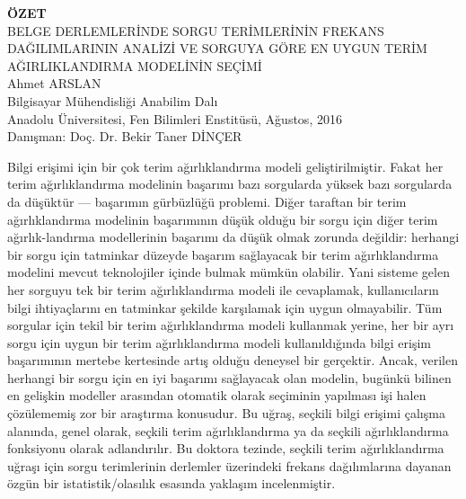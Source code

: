 \newpage
\begin{spacing}{1.1}
\begin{center}
\textbf{\"{O}ZET} \vspace{4mm}\\
BELGE DERLEMLER\.{I}NDE SORGU TER\.{I}MLER\.{I}N\.{I}N FREKANS DA\u{G}ILIMLARININ ANAL\.{I}Z\.{I} VE SORGUYA G\"{O}RE EN UYGUN TER\.{I}M A\u{G}IRLIKLANDIRMA MODEL\.{I}N\.{I}N SE\c{C}\.{I}M\.{I}\\
\vspace{4mm}
Ahmet ARSLAN
\vspace{4mm} \\
Bilgisayar M\"{u}hendisli\u{g}i Anabilim Dal{\i} \\
Anadolu \"{U}niversitesi, Fen Bilimleri Enstit\"{u}s\"{u}, A\u{g}ustos, 2016 \\
\vspace{4mm}
Dan{\i}\c{s}man: Do\c{c}. Dr. Bekir Taner D\.{I}N\c{C}ER \\
\end{center}
\vspace*{-1mm}


Bilgi eri\c{s}imi i\c{c}in bir \c{c}ok terim a\u{g}{\i}rl{\i}kland{\i}rma modeli geli\c{s}tirilmi\c{s}tir. 
Fakat her terim a\u{g}{\i}rl{\i}kland{\i}rma modelinin ba\c{s}ar{\i}m{\i} baz{\i} sorgularda y\"{u}ksek baz{\i} sorgularda da d\"{u}\c{s}\"{u}kt\"{u}r --- ba\c{s}ar{\i}m{\i}n g\"{u}rb\"{u}zl\"{u}\u{g}\"{u} problemi. 
Di\u{g}er taraftan bir terim a\u{g}{\i}rl{\i}kland{\i}rma modelinin ba\c{s}ar{\i}m{\i}n{\i}n d\"{u}\c{s}\"{u}k oldu\u{g}u bir sorgu i\c{c}in di\u{g}er terim a\u{g}{\i}rl{\i}k-land{\i}rma modellerinin ba\c{s}ar{\i}m{\i} da d\"{u}\c{s}\"{u}k olmak zorunda de\u{g}ildir: herhangi bir sorgu i\c{c}in tatminkar d\"{u}zeyde ba\c{s}ar{\i}m sa\u{g}layacak bir terim a\u{g}{\i}rl{\i}kland{\i}rma modelini mevcut teknolojiler i\c{c}inde bulmak m\"{u}mk\"{u}n olabilir. Yani sisteme gelen her sorguyu tek bir terim a\u{g}{\i}rl{\i}kland{\i}rma modeli ile cevaplamak, kullan{\i}c{\i}lar{\i}n bilgi ihtiya\c{c}lar{\i}n{\i} en tatminkar \c{s}ekilde kar\c{s}{\i}lamak i\c{c}in uygun olmayabilir. T\"{u}m sorgular i\c{c}in tekil bir terim a\u{g}{\i}rl{\i}kland{\i}rma modeli kullanmak yerine, her bir ayr{\i} sorgu i\c{c}in uygun bir terim a\u{g}{\i}rl{\i}kland{\i}rma modeli kullan{\i}ld{\i}\u{g}{\i}nda bilgi eri\c{s}im ba\c{s}ar{\i}m{\i}n{\i}n mertebe kertesinde art{\i}\c{s} oldu\u{g}u deneysel bir ger\c{c}ektir. Ancak, verilen herhangi bir sorgu i\c{c}in en iyi ba\c{s}ar{\i}m{\i} sa\u{g}layacak olan modelin, bug\"{u}nk\"{u} bilinen en geli\c{s}kin modeller aras{\i}ndan otomatik olarak se\c{c}iminin yap{\i}lmas{\i} i\c{s}i halen \c{c}\"{o}z\"{u}lememi\c{s} zor bir ara\c{s}t{\i}rma konusudur. Bu u\u{g}ra\c{s}, se\c{c}kili bilgi eri\c{s}imi \c{c}al{\i}\c{s}ma alan{\i}nda, genel olarak, se\c{c}kili terim a\u{g}{\i}rl{\i}kland{\i}rma ya da se\c{c}kili a\u{g}{\i}rl{\i}kland{\i}rma fonksiyonu olarak adland{\i}r{\i}l{\i}r. Bu doktora tezinde, se\c{c}kili terim a\u{g}{\i}rl{\i}kland{\i}rma u\u{g}ra\c{s}{\i} i\c{c}in sorgu terimlerinin derlemler \"{u}zerindeki frekans da\u{g}{\i}l{\i}mlar{\i}na dayanan \"{o}zg\"{u}n bir istatistik/olas{\i}l{\i}k esas{\i}nda yakla\c{s}{\i}m incelenmi\c{s}tir.


\end{spacing}

